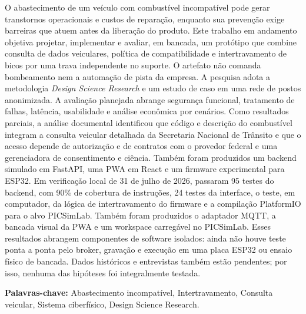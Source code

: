 \documentclass[12pt]{article}
\begin{document}
\begin{resumo}
O abastecimento de um veículo com combustível incompatível pode gerar
transtornos operacionais e custos de reparação, enquanto sua prevenção exige
barreiras que atuem antes da liberação do produto. Este trabalho em andamento
objetiva projetar, implementar e avaliar, em bancada, um protótipo que combine
consulta de dados veiculares, política de compatibilidade e intertravamento de
bicos por uma trava independente no suporte. O artefato não comanda
bombeamento nem a automação de pista da empresa. A pesquisa adota a metodologia
\textit{Design Science Research} e um
estudo de caso em uma rede de postos anonimizada. A avaliação planejada abrange
segurança funcional, tratamento de falhas, latência, usabilidade e análise
econômica por cenários. Como resultados parciais, a análise documental
identificou que código e descrição do combustível integram a consulta veicular
detalhada da Secretaria Nacional de Trânsito e que o acesso depende de
autorização e de contratos com o provedor federal e uma gerenciadora de
consentimento e ciência. Também foram produzidos um backend simulado em
FastAPI, uma PWA em React e um firmware experimental para ESP32. Em verificação
local de 31 de julho de 2026, passaram 95 testes do backend, com 90\% de
cobertura de instruções, 24 testes da interface, o teste, em computador,
da lógica de intertravamento do firmware e a compilação PlatformIO para o alvo
PICSimLab. Também foram produzidos o adaptador MQTT, a bancada visual da PWA e
um workspace carregável no PICSimLab. Esses resultados abrangem componentes de
software isolados: ainda não houve teste ponta a ponta pelo broker, gravação e
execução em uma placa ESP32 ou ensaio físico de bancada. Dados históricos e entrevistas
também estão pendentes; por isso, nenhuma das hipóteses foi integralmente
testada.

\par\smallskip\noindent\textbf{Palavras-chave:} Abastecimento incompatível,
Intertravamento, Consulta veicular, Sistema ciberfísico, Design Science Research.
\end{resumo}


















\end{document}
